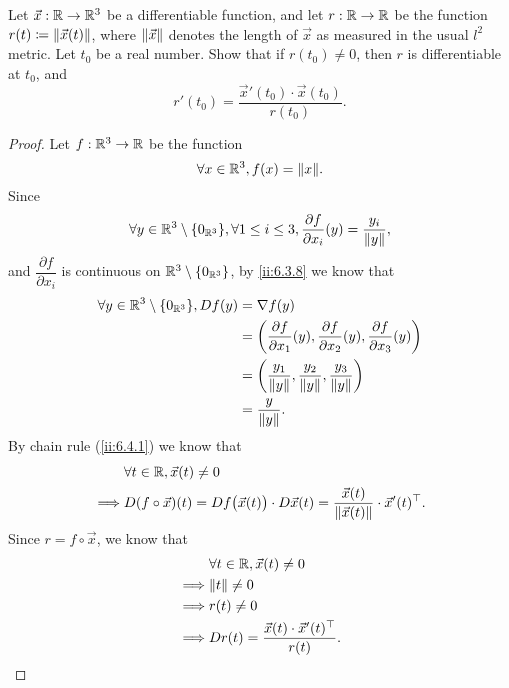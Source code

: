 \begin{ex}\label{ii:ex:6.4.5}
  Let \(\vec{x} : \R \to \R^3\) be a differentiable function, and let \(r : \R \to \R\) be the function \(r(t) \coloneqq \norm*{\vec{x}(t)}\), where \(\norm*{\vec{x}}\) denotes the length of \(\vec{x}\) as measured in the usual \(l^2\) metric.
  Let \(t_0\) be a real number.
  Show that if \(r(t_0) \neq 0\), then \(r\) is differentiable at \(t_0\), and
  \[
    r'(t_0) = \dfrac{\vec{x}'(t_0) \cdot \vec{x}(t_0)}{r(t_0)}.
  \]
\end{ex}

\begin{proof}
  Let \(f : \R^3 \to \R\) be the function
  \[
    \forall x \in \R^3, f(x) = \norm*{x}.
  \]
  Since
  \[
    \forall y \in \R^3 \setminus \set{0_{\R^3}}, \forall 1 \leq i \leq 3, \dfrac{\partial f}{\partial x_i}(y) = \dfrac{y_i}{\norm*{y}},
  \]
  and \(\dfrac{\partial f}{\partial x_i}\) is continuous on \(\R^3 \setminus \set{0_{\R^3}}\), by \cref{ii:6.3.8} we know that
  \begin{align*}
    \forall y \in \R^3 \setminus \set{0_{\R^3}}, D f(y) & = \nabla f(y)                                                                                                               \\
                                                        & = \bigg(\dfrac{\partial f}{\partial x_1}(y), \dfrac{\partial f}{\partial x_2}(y), \dfrac{\partial f}{\partial x_3}(y)\bigg) \\
                                                        & = \bigg(\dfrac{y_1}{\norm*{y}}, \dfrac{y_2}{\norm*{y}}, \dfrac{y_3}{\norm*{y}}\bigg)                                        \\
                                                        & = \dfrac{y}{\norm*{y}}.
  \end{align*}
  By chain rule (\cref{ii:6.4.1}) we know that
  \begin{align*}
             & \forall t \in \R, \vec{x}(t) \neq 0                                                                                                  \\
    \implies & D (f \circ \vec{x})(t) = D f\big(\vec{x}(t)\big) \cdot D \vec{x}(t) = \dfrac{\vec{x}(t)}{\norm*{\vec{x}(t)}} \cdot \vec{x}'(t)^\top.
  \end{align*}
  Since \(r = f \circ \vec{x}\), we know that
  \begin{align*}
             & \forall t \in \R, \vec{x}(t) \neq 0                       \\
    \implies & \norm*{t} \neq 0                                          \\
    \implies & r(t) \neq 0                                               \\
    \implies & D r(t) = \dfrac{\vec{x}(t) \cdot \vec{x}'(t)^\top}{r(t)}.
  \end{align*}
\end{proof}
